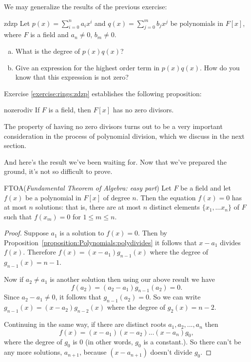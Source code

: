 \noindent
We may generalize the results of the previous exercise:

\begin{exercise}{zdzp}
Let $p(x)=\sum_{i=0}^{n} a_ix^i$ and $q(x)=\sum_{j=0}^{m} b_jx^j$ be polynomials in $F[x]$, where $F$ is a field and $a_n\neq 0$, $b_m\neq 0$.
\begin{enumerate}[(a)]
\item
What is the degree of $p(x)q(x)$?
\item
Give an expression for the highest order term in $p(x)q(x)$. How do you know that this expression is not zero? 
\end{enumerate}
\end{exercise}

Exercise \ref{exercise:rings:zdzp} establishes the following proposition: 

\begin{prop}{nozerodiv} If $F$ is a field, then $F[x]$ has no zero divisors.
\end{prop}

The property of having no zero divisors turns out to be a very important consideration in the process of polynomial division, which we discuss in the next section.

And here's the result we've been waiting for. Now that we've prepared the ground, it's not so difficult to prove.

\begin{prop}{FTOA}(\emph{Fundamental Theorem of Algebra: easy part})
Let $F$ be a field and let $f(x)$ be a polynomial in $F[x]$ of degree $n$. Then the equation $f(x)=0$ has at most $n$ solutions: that is, there are at most $n$ distinct elements $\{x_1,\ldots x_n\}$ of $F$ such that $f(x_m)=0$ for $1 \le m \le n$.
\end {prop}


\begin{proof}
Suppose $a_1$ is a solution to $f(x)=0$. Then by Proposition~\ref{proposition:Polynomials:polydivides} it follows that $x-a_1$ divides $f(x)$. Therefore $f(x) = (x-a_1) g_{n-1}(x)$ where the degree of $g_{n-1}(x)=n-1$. 

Now if $a_2 \neq a_1$ is another solution then using our above result we have
\[ f(a_2) = (a_2 - a_1)g_{n-1}(a_2) = 0. \]
Since $a_2 - a_1 \neq 0$, it follows that $g_{n-1}(a_2) = 0$. So we can write $g_{n - 1}(x) = (x-a_2)g_{n-2}(x)$ where the degree of $g_2(x) = n-2$. 

Continuing in the same way, if there are distinct roots $a_1,a_2,...,a_n$ then 
\[
f(x) = (x - a_1)(x - a_2)...(x - a_n)g_0, \]
 where the degree of $g_0$ is 0 (in other words, $g_0$ is a constant.). So there can't be any more solutions, $a_{n+1}$, because $(x-a_{n+1})$ doesn't divide $g_0$.
\end {proof}

